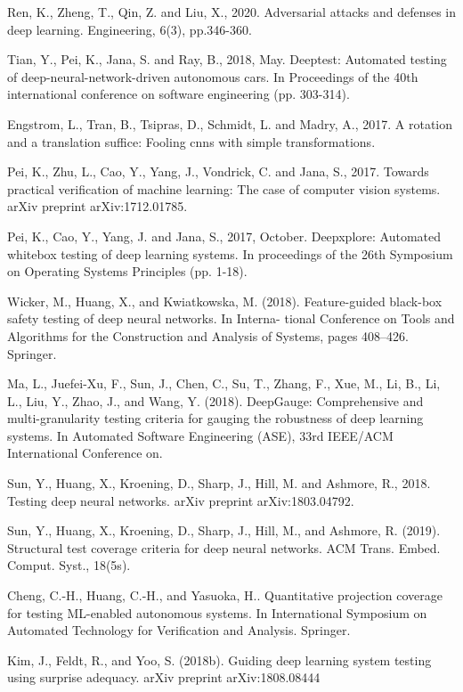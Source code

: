\begin{singlespace}
\begin{thebibliography}{}
Ren, K., Zheng, T., Qin, Z. and Liu, X., 2020. Adversarial attacks and defenses in deep learning. Engineering, 6(3), pp.346-360.

Tian, Y., Pei, K., Jana, S. and Ray, B., 2018, May. Deeptest: Automated testing of deep-neural-network-driven autonomous cars. In Proceedings of the 40th international conference on software engineering (pp. 303-314).


Engstrom, L., Tran, B., Tsipras, D., Schmidt, L. and Madry, A., 2017. A rotation and a translation suffice: Fooling cnns with simple transformations.

Pei, K., Zhu, L., Cao, Y., Yang, J., Vondrick, C. and Jana, S., 2017. Towards practical verification of machine learning: The case of computer vision systems. arXiv preprint arXiv:1712.01785.

  
 Pei, K., Cao, Y., Yang, J. and Jana, S., 2017, October. Deepxplore: Automated whitebox testing of deep learning systems. In proceedings of the 26th Symposium on Operating Systems Principles (pp. 1-18).

 Wicker, M., Huang, X., and Kwiatkowska, M. (2018). Feature-guided black-box safety testing of deep neural networks. In Interna- tional Conference on Tools and Algorithms for the Construction and Analysis of Systems, pages 408–426. Springer.

 Ma, L., Juefei-Xu, F., Sun, J., Chen, C., Su, T., Zhang, F., Xue, M., Li, B., Li, L., Liu, Y., Zhao, J., and Wang, Y. (2018). DeepGauge: Comprehensive and multi-granularity testing criteria for gauging the robustness of deep learning systems. In Automated Software Engineering (ASE), 33rd IEEE/ACM International Conference on.

    
Sun, Y., Huang, X., Kroening, D., Sharp, J., Hill, M. and Ashmore, R., 2018. Testing deep neural networks. arXiv preprint arXiv:1803.04792.

 Sun, Y., Huang, X., Kroening, D., Sharp, J., Hill, M., and Ashmore, R. (2019). Structural test coverage criteria for deep neural networks. ACM Trans. Embed. Comput. Syst., 18(5s).

Cheng, C.-H., Huang, C.-H., and Yasuoka, H.. Quantitative projection coverage for testing ML-enabled autonomous systems. In International Symposium on Automated Technology for Verification and Analysis. Springer.

 Kim, J., Feldt, R., and Yoo, S. (2018b). Guiding deep learning system testing using surprise adequacy. arXiv preprint arXiv:1808.08444


\end{thebibliography}
\end{singlespace}
